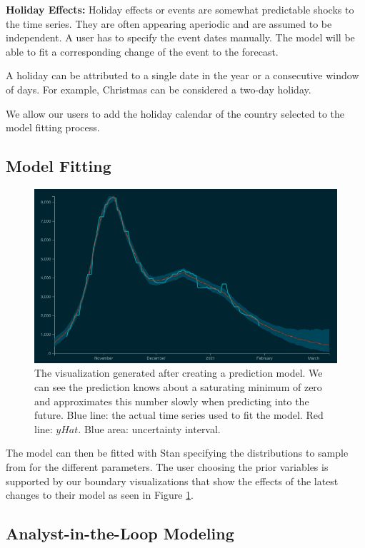 \textbf{Holiday Effects:} Holiday effects or events are somewhat predictable shocks to the time series. They are often appearing aperiodic and are assumed to be independent. A user has to specify the event dates manually. The model will be able to fit a corresponding change of the event to the forecast.

A holiday can be attributed to a single date in the year or a consecutive window of days. For example, Christmas can be considered a two-day holiday.

 We allow our users to add the holiday calendar of the country selected to the model fitting process.

\subsection{Model Fitting}

\begin{figure}
\centerline{\includegraphics[scale=.328]{figs/screenshot-prediction.png}}
\caption{The visualization generated after creating a prediction model. We can see the prediction knows about a saturating minimum of zero and approximates this number slowly when predicting into the future. Blue line: the actual time series used to fit the model. Red line: \(yHat\). Blue area: uncertainty interval.}
\label{fig:screenshot-prediction}
\end{figure}

The model can then be fitted with Stan \cite{b5} specifying the distributions to sample from for the different parameters. The user choosing the prior variables is supported by our boundary visualizations that show the effects of the latest changes to their model as seen in Figure \ref{fig:screenshot-prediction}.

\subsection{Analyst-in-the-Loop Modeling}

